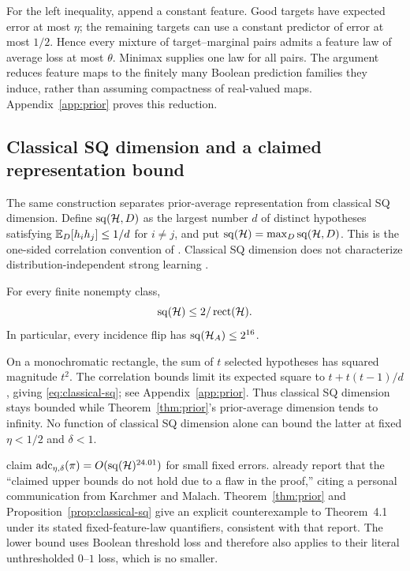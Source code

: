 For the left inequality, append a constant feature. Good targets have expected error at most $\eta$; the remaining targets can use a constant predictor of error at most $1/2$. Hence every mixture of target--marginal pairs admits a feature law of average loss at most $\theta$. Minimax supplies one law for all pairs. The argument reduces feature maps to the finitely many Boolean prediction families they induce, rather than assuming compactness of real-valued maps. Appendix~\ref{app:prior} proves this reduction.

\subsection{Classical SQ dimension and a claimed representation bound}\label{sec:km}
The same construction separates prior-average representation from classical SQ dimension. Define $\operatorname{sq}(\mathcal H,D)$ as the largest number $d$ of distinct hypotheses satisfying $\mathbb E_D[h_i h_j]\le1/d$ for $i\ne j$, and put $\operatorname{sq}(\mathcal H)=\max_D\operatorname{sq}(\mathcal H,D)$. This is the one-sided correlation convention of \citet[Definition~3.5]{KM25}. Classical SQ dimension does not characterize distribution-independent strong learning \citep{Feldman17}.

\begin{proposition}\label{prop:classical-sq}
For every finite nonempty class,
\begin{equation}
 \operatorname{sq}(\mathcal H)\le 2/\operatorname{rect}(\mathcal H).
 \label{eq:classical-sq}
\end{equation}
In particular, every incidence flip has $\operatorname{sq}(\mathcal H_A)\le2^{16}$.
\end{proposition}

On a monochromatic rectangle, the sum of $t$ selected hypotheses has squared magnitude $t^2$. The correlation bounds limit its expected square to $t+t(t-1)/d$, giving \eqref{eq:classical-sq}; see Appendix~\ref{app:prior}. Thus classical SQ dimension stays bounded while Theorem~\ref{thm:prior}'s prior-average dimension tends to infinity. No function of classical SQ dimension alone can bound the latter at fixed $\eta<1/2$ and $\delta<1$.

\citet[Theorem~4.1]{KM25} claim $\operatorname{adc}_{\eta,\delta}(\pi)=O(\operatorname{sq}(\mathcal H)^{24.01})$ for small fixed errors. \citet{FKS26} already report that the ``claimed upper bounds do not hold due to a flaw in the proof,'' citing a personal communication from Karchmer and Malach. Theorem~\ref{thm:prior} and Proposition~\ref{prop:classical-sq} give an explicit counterexample to Theorem~4.1 under its stated fixed-feature-law quantifiers, consistent with that report. The lower bound uses Boolean threshold loss and therefore also applies to their literal unthresholded $0$--$1$ loss, which is no smaller.

